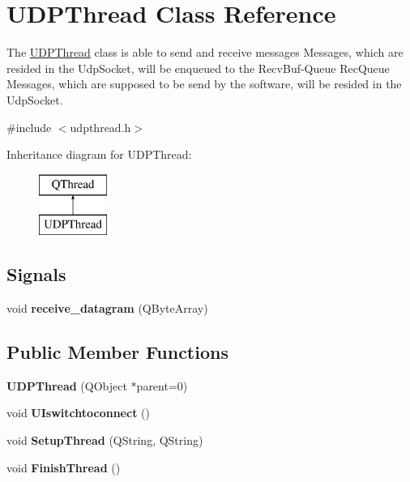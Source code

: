 \hypertarget{class_u_d_p_thread}{}\section{U\+D\+P\+Thread Class Reference}
\label{class_u_d_p_thread}


The \hyperlink{class_u_d_p_thread}{U\+D\+P\+Thread} class is able to send and receive messages Messages, which are resided in the Udp\+Socket, will be enqueued to the Recv\+Buf-\/\+Queue Rec\+Queue Messages, which are supposed to be send by the software, will be resided in the Udp\+Socket.  




{\ttfamily \#include $<$udpthread.\+h$>$}

Inheritance diagram for U\+D\+P\+Thread\+:\begin{figure}[H]
\begin{center}
\leavevmode
\includegraphics[height=2.000000cm]{class_u_d_p_thread}
\end{center}
\end{figure}
\subsection*{Signals}
\begin{DoxyCompactItemize}
\item 
\hypertarget{class_u_d_p_thread_a69d3f7b11b8741a043c0e0e8c96896b3}{}void {\bfseries receive\+\_\+datagram} (Q\+Byte\+Array)\label{class_u_d_p_thread_a69d3f7b11b8741a043c0e0e8c96896b3}

\end{DoxyCompactItemize}
\subsection*{Public Member Functions}
\begin{DoxyCompactItemize}
\item 
\hypertarget{class_u_d_p_thread_a90ab3e13bf9c4df446c2126ab76b0ef5}{}{\bfseries U\+D\+P\+Thread} (Q\+Object $\ast$parent=0)\label{class_u_d_p_thread_a90ab3e13bf9c4df446c2126ab76b0ef5}

\item 
\hypertarget{class_u_d_p_thread_a588f976d998e8da61fe4887bb2297e24}{}void {\bfseries U\+Iswitchtoconnect} ()\label{class_u_d_p_thread_a588f976d998e8da61fe4887bb2297e24}

\item 
\hypertarget{class_u_d_p_thread_a4c296054132eea751c34103e66fbcac4}{}void {\bfseries Setup\+Thread} (Q\+String, Q\+String)\label{class_u_d_p_thread_a4c296054132eea751c34103e66fbcac4}

\item 
\hypertarget{class_u_d_p_thread_a456f8ce6d9f1e29f4d7797ffc799fae4}{}void {\bfseries Finish\+Thread} ()\label{class_u_d_p_thread_a456f8ce6d9f1e29f4d7797ffc799fae4}

\end{DoxyCompactItemize}
